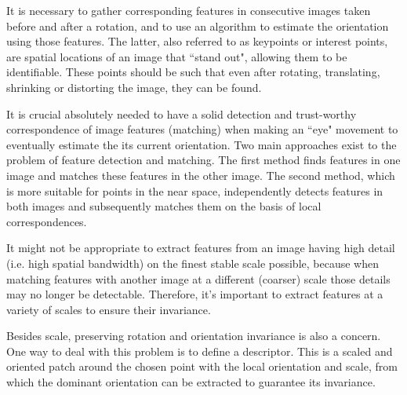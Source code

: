 It is necessary to gather corresponding features in consecutive images taken before and after a rotation, and to use an algorithm to estimate the orientation using those features. The latter, also referred to as keypoints or interest points, are spatial locations of an image that ``stand out", allowing them to be identifiable. These points should be such that even after rotating, translating, shrinking or distorting the image, they can be found.

It is crucial absolutely needed to have a solid detection and trust-worthy correspondence of image features (matching) when making an ``eye" movement to eventually estimate the its current orientation. Two main approaches exist to the problem of feature detection and matching. The first method finds features in one image and matches these features in the other image. The second method, which is more suitable for points in the near space, independently detects features in both images and subsequently matches them on the basis of local correspondences.

It might not be appropriate to extract features from an image having high detail (i.e. high spatial bandwidth) on the finest stable scale possible, because when matching features with another image at a different (coarser) scale those details may no longer be detectable. Therefore, it's important to extract features at a variety of scales to ensure their invariance. 

Besides scale, preserving rotation and orientation invariance is also a concern. One way to deal with this problem is to define a descriptor. This is a scaled and oriented patch around the chosen point with the local orientation and scale, from which the dominant orientation can be extracted to guarantee its invariance. \cite{multiview}

